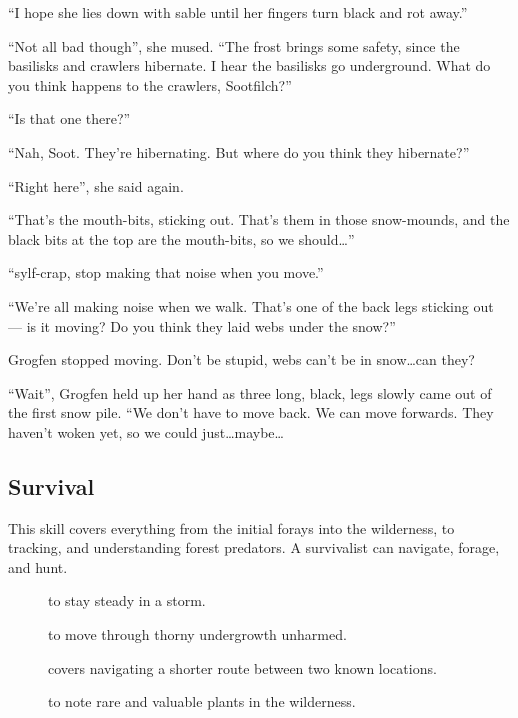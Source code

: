 \begin{multicols}{2}
\begin{exampletext}
  ``I hope she lies down with \gls{sable} until her fingers turn black and rot away.''

  ``Not all bad though'', she mused.
  ``The frost brings some safety, since the \glspl{basilisk} and \glspl{crawler} hibernate.
  I hear the \glspl{basilisk} go underground.
  What do you think happens to the \glspl{crawler}, Sootfilch?''

  ``Is that one there?''

  ``Nah, Soot.
  They're hibernating.
  But where do you think they hibernate?''

  ``Right here'', she said again.
  {\small
    ``That's the mouth-bits, sticking out.
    That's them in those snow-mounds, and the black bits at the top are the mouth-bits, so we should\ldots''

    ``\Gls{sylf}-crap, stop making that noise when you move.''
  }{\footnotesize
    ``We're all making noise when we walk.
    That's one of the back legs sticking out --- is it moving?
    Do you think they laid webs under the snow?''

    Grogfen stopped moving.
    Don't be stupid, webs can't be in snow\ldots can they?
  }{\scriptsize
    ``Wait'',
    Grogfen held up her hand as three long, black, legs slowly came out of the first snow pile.
    ``We don't have to move back.
    We can move forwards.
    They haven't woken yet, so we could just\ldots maybe\ldots
  }

\end{exampletext}

\subsection{Survival}

This skill covers everything from the initial forays into the wilderness, to tracking, and understanding forest predators.
A survivalist can navigate, forage, and hunt.

\begin{description}
  \item[]
    to stay steady in a storm.
  \item[]
    to move through thorny undergrowth unharmed.
  \item[]
    covers navigating a shorter route between two known locations.
  \item[]
    to note rare and valuable plants in the wilderness.
\end{description}


\end{multicols}
